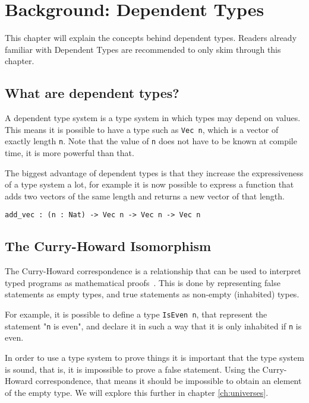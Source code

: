 \chapter{\label{chap:bg-dp}Background: Dependent Types}

This chapter will explain the concepts behind dependent types. Readers already familiar with Dependent Types are recommended to only skim through this chapter.

\section{What are dependent types?}

A dependent type system is a type system in which types may depend on values. This means it is possible to have a type such as \verb|Vec n|, which is a vector of exactly length \verb|n|. Note that the value of \verb|n| does not have to be known at compile time, it is more powerful than that. 

The biggest advantage of dependent types is that they increase the expressiveness of a type system a lot, for example it is now possible to express a function that adds two vectors of the same length and returns a new vector of that length. 
\begin{lstlisting}
add_vec : (n : Nat) -> Vec n -> Vec n -> Vec n
\end{lstlisting}

\section{The Curry-Howard Isomorphism}

The Curry-Howard correspondence is a relationship that can be used to interpret typed programs as mathematical proofs~\cite{chc}. This is done by representing false statements as empty types, and true statements as non-empty (inhabited) types. 

For example, it is possible to define a type \verb|IsEven n|, that represent the statement "\verb|n| is even", and declare it in such a way that it is only inhabited if \verb|n| is even.

In order to use a type system to prove things it is important that the type system is sound, that is, it is impossible to prove a false statement. Using the Curry-Howard correspondence, that means it should be impossible to obtain an element of the empty type. We will explore this further in chapter \ref{ch:universes}.


